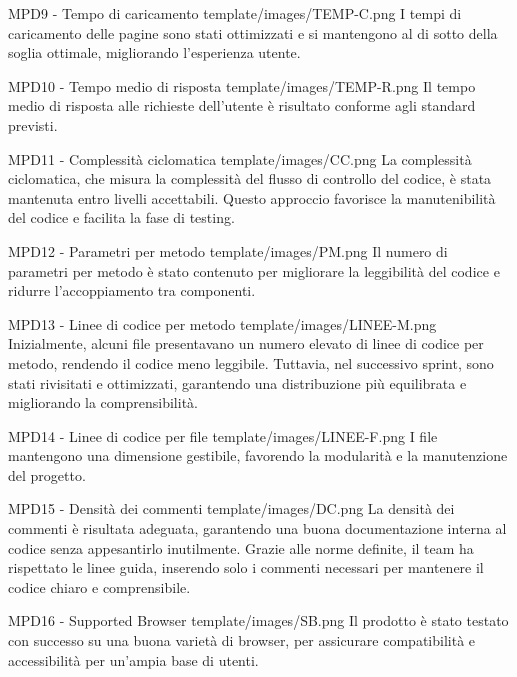 \MetNoPB
{ %
    MPD9 - Tempo di caricamento    
}
{ %
    template/images/TEMP-C.png
}
{   %
    I tempi di caricamento delle pagine sono stati ottimizzati e si mantengono al di sotto della soglia ottimale, migliorando l’esperienza utente.
}

\MetNoPB
{ %
    MPD10 - Tempo medio di risposta    
}
{ %
    template/images/TEMP-R.png
}
{   %
    Il tempo medio di risposta alle richieste dell’utente è risultato conforme agli standard previsti.
}

\MetNoPB
{ %
    MPD11 - Complessità ciclomatica 
}
{ %
    template/images/CC.png
}
{   %
    La complessità ciclomatica, che misura la complessità del flusso di controllo del codice, è stata mantenuta entro livelli accettabili. Questo approccio favorisce la manutenibilità del codice e facilita la fase di testing.
}

\MetNoPB
{ %
    MPD12 - Parametri per metodo
}
{ %
    template/images/PM.png
}
{   %
    Il numero di parametri per metodo è stato contenuto per migliorare la leggibilità del codice e ridurre l'accoppiamento tra componenti.
}

\MetNoPB
{ %
    MPD13 -  Linee di codice per metodo
}
{ %
    template/images/LINEE-M.png
}
{   %
Inizialmente, alcuni file presentavano un numero elevato di linee di codice per metodo, rendendo il codice meno leggibile. Tuttavia, nel successivo sprint, sono stati rivisitati e ottimizzati, garantendo una distribuzione più equilibrata e migliorando la comprensibilità.
}

\MetNoPB
{ %
    MPD14 -  Linee di codice per file
}
{ %
    template/images/LINEE-F.png
}
{   %
    I file mantengono una dimensione gestibile, favorendo la modularità e la manutenzione del progetto.
}

\MetNoPB
{ %
    MPD15 -  Densità dei commenti
}
{ %
    template/images/DC.png
}
{   %
    La densità dei commenti è risultata adeguata, garantendo una buona documentazione interna al codice senza appesantirlo inutilmente. Grazie alle norme definite, il team ha rispettato le linee guida, inserendo solo i commenti necessari per mantenere il codice chiaro e comprensibile.
}

\MetNoPB
{ %
    MPD16 -  Supported Browser
}
{ %
    template/images/SB.png
}
{   %
    Il prodotto è stato testato con successo su una buona varietà di browser, per assicurare compatibilità e accessibilità per un’ampia base di utenti.
}
